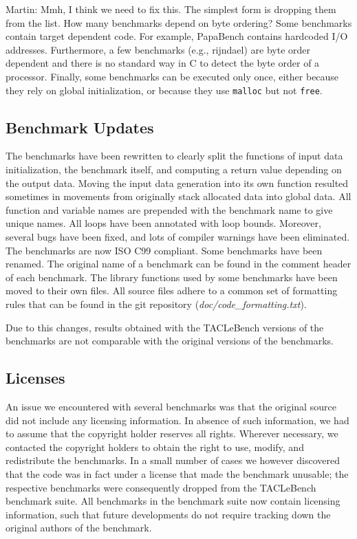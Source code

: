 \documentclass[a4paper,UKenglish]{oasics}
\newcommand{\todo}[1]{{\emph{TODO: #1}}}
\newcommand{\martin}[1]{{\color{blue} Martin: #1}}
\newcommand{\code}[1]{{\small{\texttt{#1}}}}
\begin{document}
\martin{Mmh, I think we need to fix this. The simplest form is dropping them
from the list. How many benchmarks depend on byte ordering?}
Some benchmarks contain target dependent code.
For example, PapaBench contains hardcoded I/O addresses.
Furthermore, a few benchmarks (e.g., rijndael) are byte order dependent
and there is no standard way in C to detect the byte order of a processor.
Finally, some benchmarks can be executed only once, either because
they rely on global initialization, or because they use \code{malloc} but not \code{free}.


\subsection{Benchmark Updates}

The benchmarks have been rewritten to clearly split the functions of
input data initialization, the benchmark itself, and computing a return
value depending on the output data. Moving the input data generation
into its own function resulted sometimes in movements from originally
stack allocated data into global data.
All function and variable names are prepended with the benchmark
name to give unique names.
All loops have been annotated with loop bounds.
Moreover, several bugs have been fixed, and lots of compiler warnings have been eliminated.
The benchmarks are now ISO C99 compliant.
Some benchmarks have been renamed. The original name of a benchmark can be found in the comment header of each benchmark.
The library functions used by some benchmarks have been moved to their own files.
All source files adhere to a common set of formatting rules that can be found in the git repository (\textit{doc/code\_formatting.txt}).


Due to this changes, results obtained with the TACLeBench versions
of the benchmarks are not comparable with the original versions of
the benchmarks.


\subsection{Licenses}

An issue we encountered with several benchmarks was that the original
source did not include any licensing information. In absence of such
information, we had to assume that the copyright holder reserves all
rights. Wherever necessary, we contacted the copyright holders to
obtain the right to use, modify, and redistribute the benchmarks. In a
small number of cases we however discovered that the code was in fact
under a license that made the benchmark unusable; the respective
benchmarks were consequently dropped from the TACLeBench benchmark
suite. All benchmarks in the benchmark suite now contain licensing
information, such that future developments do not require tracking
down the original authors of the benchmark.
\end{document}
